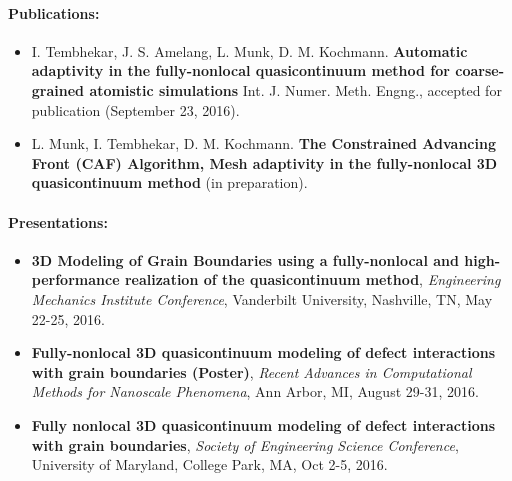 \documentclass[10pt,fleqn]{article}
\begin{document}
\vspace{-10pt}
\paragraph*{Publications:}
\vspace{-10pt}
\begin{itemize}
\setlength{\itemsep}{8pt}
\setlength{\parskip}{0pt}
\item I. Tembhekar, J. S. Amelang, L. Munk, D. M. Kochmann. \textbf{Automatic adaptivity in the fully-nonlocal quasicontinuum method for coarse-grained atomistic simulations} Int. J. Numer. Meth. Engng., accepted for publication (September 23, 2016).
\item  L. Munk, I. Tembhekar, D. M. Kochmann. \textbf{The Constrained Advancing Front (CAF) Algorithm, Mesh adaptivity in the fully-nonlocal 3D quasicontinuum method} (in preparation).
\end{itemize}
\paragraph*{Presentations:}
\vspace{-10pt}
\begin{itemize}
\setlength{\itemsep}{8pt}
\setlength{\parskip}{0pt}
\item \textbf{3D Modeling of Grain Boundaries using a fully-nonlocal and high-performance realization of the quasicontinuum method}, \emph{Engineering Mechanics Institute Conference}, Vanderbilt University, Nashville, TN, May 22-25, 2016.
\item \textbf{Fully-nonlocal 3D quasicontinuum modeling of defect interactions with grain boundaries (Poster)}, \emph{Recent Advances in Computational Methods for Nanoscale Phenomena}, Ann Arbor, MI, August 29-31, 2016.
\item \textbf{Fully nonlocal 3D quasicontinuum modeling of defect interactions with grain boundaries}, \emph{Society of Engineering Science Conference}, University of Maryland, College Park, MA, Oct 2-5, 2016.
\end{itemize}
\end{document}
